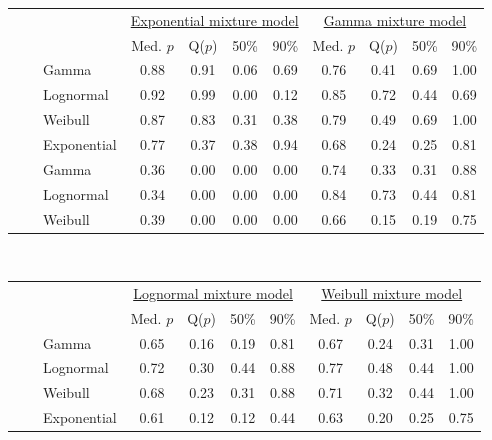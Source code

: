 \documentclass[12pt]{article}
\begin{document}
\begin{table}[ht]
\footnotesize\centering
\begin{tabular}{l|l|l|cccc|cccc}
 \multicolumn{3}{c}{ } & \multicolumn{4}{c}{\underline{Exponential mixture model}} & \multicolumn{4}{c}{\underline{Gamma mixture model}} \\
 \multicolumn{3}{c}{ } & Med. $p$ & Q($p$) & 50\% & 90\%  & Med. $p$ & Q($p$) & 50\% & 90\% \\ 
  \hline
\parbox[t]{2mm}{} & \parbox[t]{2mm}{} & Gamma & 0.88 & 0.91 & 0.06 & 0.69 & 0.76 & 0.41 & 0.69 & 1.00 \\ 
& &   Lognormal & 0.92 & 0.99 & 0.00 & 0.12 & 0.85 & 0.72 & 0.44 & 0.69 \\ 
& &   Weibull & 0.87 & 0.83 & 0.31 & 0.38 & 0.79 & 0.49 & 0.69 & 1.00 \\ 
& &   Exponential & 0.77 & 0.37 & 0.38 & 0.94 & 0.68 & 0.24 & 0.25 & 0.81 \\ 
& \parbox[t]{2mm}{} & Gamma & 0.36 & 0.00 & 0.00 & 0.00 & 0.74 & 0.33 & 0.31 & 0.88 \\ 
& &   Lognormal & 0.34 & 0.00 & 0.00 & 0.00 & 0.84 & 0.73 & 0.44 & 0.81 \\ 
& &   Weibull & 0.39 & 0.00 & 0.00 & 0.00 & 0.66 & 0.15 & 0.19 & 0.75 \\
   \hline
\end{tabular}
\vspace{0.5cm}\\
\begin{tabular}{l|l|l|cccc|cccc}
 \multicolumn{3}{c}{ } & \multicolumn{4}{c}{\underline{Lognormal mixture model}} & \multicolumn{4}{c}{\underline{Weibull mixture model}} \\
 \multicolumn{3}{c}{ } & Med. $p$ & Q($p$) & 50\% & 90\% & Med. $p$ & Q($p$) & 50\% & 90\% \\ 
  \hline
\parbox[t]{2mm}{} & \parbox[t]{2mm}{} & Gamma & 0.65 & 0.16 & 0.19 & 0.81 & 0.67 & 0.24 & 0.31 & 1.00 \\ 
& &   Lognormal & 0.72 & 0.30 & 0.44 & 0.88 & 0.77 & 0.48 & 0.44 & 1.00 \\ 
& &   Weibull & 0.68 & 0.23 & 0.31 & 0.88 & 0.71 & 0.32 & 0.44 & 1.00 \\ 
& &   Exponential & 0.61 & 0.12 & 0.12 & 0.44 & 0.63 & 0.20 & 0.25 & 0.75 \\ 

\end{tabular}
\end{table}
\end{document}
